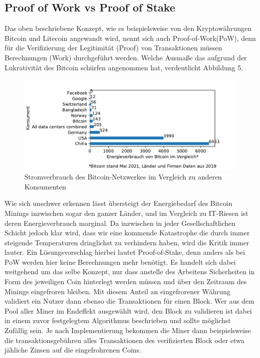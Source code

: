 \documentclass[12pt,oneside]{article}
\begin{document}
\subsection{Proof of Work vs Proof of Stake}
Das oben beschriebene Konzept, wie es beispielsweise von den Kryptowährungen Bitcoin und Litecoin angewandt wird, nennt sich auch \glqq Proof-of-Work\grqq (PoW), denn für die Verifizierung der Legitimität (Proof) von Transaktionen müssen Berechnungen (Work) durchgeführt werden. Welche Ausmaße das aufgrund der Lukrativität des Bitcoin schürfen angenommen hat, verdeutlicht Abbildung 5.
\begin{figure}[h]
\centering
\includegraphics[scale=0.7]{./images/energyconsume.pdf}
\caption{Stromverbrauch des Bitcoin-Netzwerkes im Vergleich zu anderen Konsumenten \cite{statista2021}}
\centering
\end{figure}

Wie sich unschwer erkennen lässt übersteigt der Energiebedarf des Bitcoin Minings inzwischen sogar den ganzer Länder, und im Vergleich zu IT-Riesen ist deren Energieverbrauch marginal. Da inzwischen in jeder Gesellschaftlichen Schicht jedoch klar wird, dass wir eine kommende Katastrophe die durch immer steigende Temperaturen dringlichst zu verhindern haben, wird die Kritik immer lauter. Ein Lösungsvorschlag hierbei lautet Proof-of-Stake, denn anders als bei PoW werden hier keine Berechnungen mehr benötigt. Es handelt sich dabei weitgehend um das selbe Konzept, nur dass anstelle des Arbeitens Sicherheiten in Form des jeweiligen Coin hinterlegt werden müssen und über den Zeitraum des Minings eingefroren bleiben. Mit diesem Anteil an eingefrorener Währung validiert ein Nutzer dann ebenso die Transaktionen für einen Block. Wer aus dem Pool aller Miner im Endeffekt ausgewählt wird, den Block zu validieren ist dabei in einem zuvor festgelegtem Algorithmus beschrieben und sollte möglichst Zufällig sein. Je nach Implementierung bekommen die Miner dann beispielsweise die transaktionsgebühren alles Transaktionen des verifizierten Block oder etwa jähliche Zinsen auf die eingefrohrenen Coins. \cite{soeteman2019}
\end{document}
